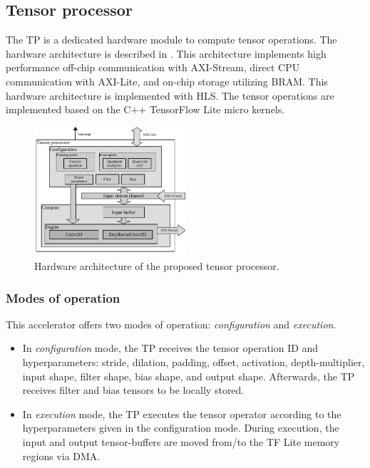 \subsection{\textbf{Tensor processor}}
The TP is a dedicated hardware module to compute tensor operations. The hardware architecture is described in . This architecture implements high performance off-chip communication with AXI-Stream, direct CPU communication with AXI-Lite, and on-chip storage utilizing BRAM. This hardware architecture is implemented with HLS. The tensor operations are implemented based on the C++ TensorFlow Lite micro kernels.
\begin{figure}[h!]
	\centering
	\includegraphics[width=0.5\textwidth]{../figures/accelerator.pdf}
	\caption{Hardware architecture of the proposed tensor processor.}
	\label{fig:accelerator}
\end{figure}

\subsubsection{\textbf{Modes of operation}} This accelerator offers two modes of operation: \emph{configuration} and \emph{execution}.

\begin{itemize}
	\item In \emph{configuration} mode, the TP receives the tensor operation ID and hyperparameters: stride, dilation, padding, offset, activation, depth-multiplier, input shape, filter shape, bias shape, and output shape. Afterwards, the TP receives filter and bias tensors to be locally stored.
	
	\item In \emph{execution} mode, the TP executes the tensor operator according to the hyperparameters given in the configuration mode. During execution, the input and output tensor-buffers are moved from/to the TF Lite memory regions via DMA.
\end{itemize}

